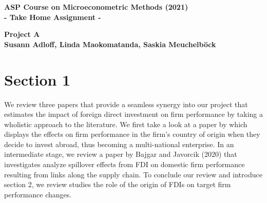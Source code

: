 \documentclass[11pt,a4paper,leqno]{article}
\begin{document}
 \begin{center}
	\begin{LARGE}
		\textbf{
			ASP Course on Microeconometric Methods (2021)\\
			 - Take Home Assignment -\\
		}
	\end{LARGE}
	\vspace{0.2cm}
	{\large \textbf{Project A}} \\\vspace{0.2cm}
	{\large \textbf{Susann Adloff, Linda Maokomatanda, Saskia Meuchelböck}} \vspace{0.2cm}
\end{center}

\section*{Section 1}
We review three papers that provide a seamless synergy into our project that estimates the impact of foreign direct investment on firm performance by taking a wholistic approach to the literature. We first take a look at a paper by \cite{borin2016foreign} which displays the effects on firm performance in the firm’s country of origin when they decide to invest abroad, thus becoming a multi-national enterprise. In an intermediate stage, we review a paper by Bajgar and Javorcik (2020)  that investigates analyze spillover effects from FDI on domestic firm performance resulting from links along the supply chain. To conclude our review and introduce section 2, we review \cite{chen2011} studies the role of the origin of FDIs on target firm performance changes.
\end{document}
